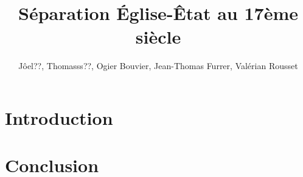 \documentclass{article}
\title{S\'eparation \'Eglise-\^Etat au 17\`eme si\`ecle}
\author{J\^oel??, Thomasss??, Ogier Bouvier, Jean-Thomas Furrer, Val\'erian Rousset}
\begin{document}
\maketitle

\section{Introduction}

\section{Conclusion}
\end{document}
